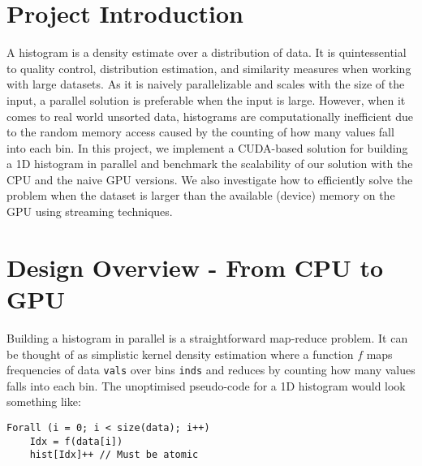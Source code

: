 \documentclass[12pt, a4paper, hidelinks]{article}
\renewcommand{\tt}[1]{\texttt{#1}}
\begin{document}

\tableofcontents
\newpage

\section{Project Introduction}
A histogram is a density estimate over a distribution of data.
It is quintessential to quality control, distribution estimation,
and similarity measures when working with large datasets.
As it is naively parallelizable and scales with the size of the input,
a parallel solution is preferable when the input is large.
However, when it comes to real world unsorted data,
histograms are computationally inefficient due to the random memory access
caused by the counting of how many values fall into each bin.
In this project, we implement a CUDA-based solution for building
a 1D histogram in parallel and benchmark the scalability of our solution with
the CPU and the naive GPU versions.
We also investigate how to efficiently solve the problem when the dataset
is larger than the available (device) memory on the GPU
using streaming techniques.

\section{Design Overview - From CPU to GPU}
Building a histogram in parallel is a straightforward map-reduce problem.
It can be thought of as simplistic kernel density estimation where a function $f$
maps frequencies of data \tt{vals} over bins \tt{inds}
and reduces by counting how many values falls into each bin.
The unoptimised pseudo-code for a 1D histogram
would look something like:

\begin{verbatim}
Forall (i = 0; i < size(data); i++)
    Idx = f(data[i])
    hist[Idx]++ // Must be atomic
\end{verbatim}
\end{document}

